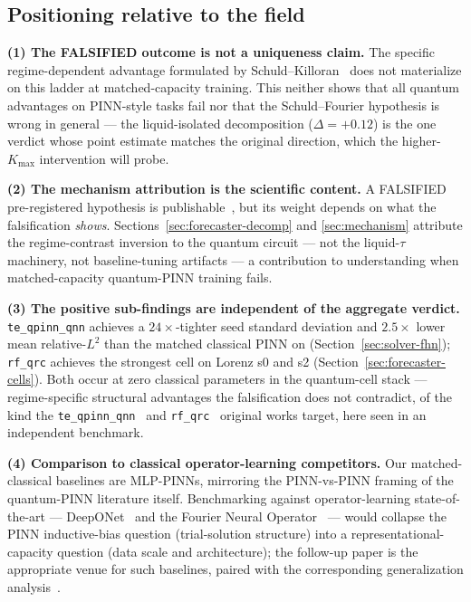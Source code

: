 \subsection{Positioning relative to the field}
\label{sec:discussion-position}

\textbf{(1) The FALSIFIED outcome is not a uniqueness claim.}
The specific regime-dependent advantage formulated by
Schuld--Killoran~\cite{schuld2022right} does not materialize on
this ladder at matched-capacity training. This neither shows that
all quantum advantages on PINN-style tasks fail nor that the
Schuld--Fourier hypothesis is wrong in general --- the
liquid-isolated decomposition ($\Delta = +0.12$) is the one
verdict whose point estimate matches the original direction, which
the higher-$K_{\max}$ intervention will probe.

\textbf{(2) The mechanism attribution is the scientific
content.} A FALSIFIED pre-registered hypothesis is
publishable~\cite{bowles2024better}, but its weight depends on
what the falsification \emph{shows}.
Sections~\ref{sec:forecaster-decomp} and \ref{sec:mechanism}
attribute the regime-contrast inversion to the quantum circuit ---
not the liquid-$\tau$ machinery, not baseline-tuning artifacts ---
a contribution to understanding when matched-capacity quantum-PINN
training fails.

\textbf{(3) The positive sub-findings are independent of the
aggregate verdict.} \texttt{te\_qpinn\_qnn} achieves a
$24\times$-tighter seed standard deviation and $2.5\times$ lower
mean relative-$L^2$ than the matched classical PINN on \fhn{}
(Section~\ref{sec:solver-fhn}); \texttt{rf\_qrc} achieves the
strongest cell on Lorenz s0 and s2
(Section~\ref{sec:forecaster-cells}). Both occur at zero classical
parameters in the quantum-cell stack --- regime-specific
structural advantages the falsification does not contradict, of
the kind the \texttt{te\_qpinn\_qnn}~\cite{berger2025teqpinn} and
\texttt{rf\_qrc}~\cite{ahmed2024rfqrc} original works target, here
seen in an independent benchmark.

\textbf{(4) Comparison to classical operator-learning competitors.}
Our matched-classical baselines are MLP-PINNs, mirroring the
PINN-vs-PINN framing of the quantum-PINN literature itself.
Benchmarking against operator-learning state-of-the-art ---
DeepONet~\cite{lu2021deeponet} and the Fourier Neural
Operator~\cite{li2021fourier} --- would collapse the PINN
inductive-bias question (trial-solution structure) into a
representational-capacity question (data scale and architecture);
the follow-up paper is the appropriate venue for such baselines,
paired with the corresponding generalization
analysis~\cite{caro2022generalization}.

